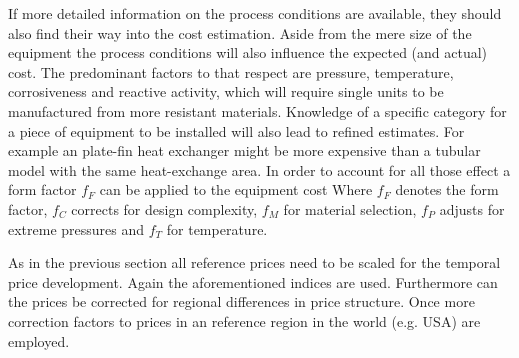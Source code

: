         If more detailed information on the process conditions are available, they should also find their way into the cost estimation.
        Aside from the mere size of the equipment the process conditions will also influence the expected (and actual)
        cost. The predominant factors to that respect are pressure, temperature, corrosiveness
        and reactive activity, which will require single units to be manufactured from more resistant materials. Knowledge
        of a specific category for a piece of equipment to be installed will also lead to refined estimates. For example an plate-fin heat
        exchanger might be more expensive than a tubular model with the same heat-exchange area.
        In order to account for all those effect a form factor $f_F$ can be applied to the equipment cost
        Where $f_F$ denotes the form factor, $f_C$ corrects for design complexity, $f_M$ for material selection,
        $f_P$ adjusts for extreme pressures and $f_T$ for temperature.

        As in the previous section all reference prices need to be scaled for the temporal price
        development. Again the aforementioned indices are used. Furthermore can the prices be corrected for regional
        differences in price structure. Once more correction factors to prices in an reference region in
        the world (e.g. USA) are employed.

